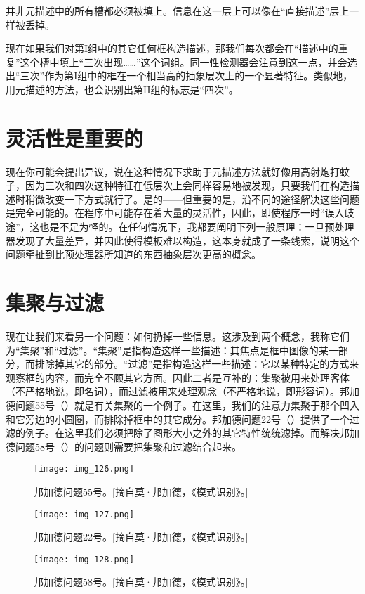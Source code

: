 并非元描述中的所有槽都必须被填上。信息在这一层上可以像在“直接描述”层上一样被丢掉。

现在如果我们对第I组中的其它任何框构造描述，那我们每次都会在“描述中的重复”这个槽中填上“三次出现……”这个词组。同一性检测器会注意到这一点，并会选出“三次”作为第I组中的框在一个相当高的抽象层次上的一个显著特征。类似地，用元描述的方法，也会识别出第II组的标志是“四次”。

\section{灵活性是重要的}

现在你可能会提出异议，说在这种情况下求助于元描述方法就好像用高射炮打蚊子，因为三次和四次这种特征在低层次上会同样容易地被发现，只要我们在构造描述时稍微改变一下方式就行了。是的——但重要的是，沿不同的途径解决这些问题是完全可能的。在程序中可能存在着大量的灵活性，因此，即使程序一时“误入歧途”，这也是不足为怪的。在任何情况下，我都要阐明下列一般原理：一旦预处理器发现了大量差异，并因此使得模板难以构造，这本身就成了一条线索，说明这个问题牵扯到比预处理器所知道的东西抽象层次更高的概念。

\section{集聚与过滤}

现在让我们来看另一个问题：如何扔掉一些信息。这涉及到两个概念，我称它们为“集聚”和“过滤”。“集聚”是指构造这样一些描述：其焦点是框中图像的某一部分，而排除掉其它的部分。“过滤”是指构造这样一些描述：它以某种特定的方式来观察框的内容，而完全不顾其它方面。因此二者是互补的：集聚被用来处理客体（不严格地说，即名词），而过滤被用来处理观念（不严格地说，即形容词）。邦加德问题55号（）就是有关集聚的一个例子。在这里，我们的注意力集聚于那个凹入和它旁边的小圆圈，而排除掉框中的其它成分。邦加德问题22号（）提供了一个过滤的例子。在这里我们必须把除了图形大小之外的其它特性统统滤掉。而解决邦加德问题58号（）的问题则需要把集聚和过滤结合起来。

\begin{figure}
\texttt{[image: img\_126.png]}
\caption[邦加德问题55号。]
  {邦加德问题55号。[摘自莫·邦加德，《模式识别》。]}
\end{figure}

\begin{figure}
\texttt{[image: img\_127.png]}
\caption[邦加德问题22号。]
  {邦加德问题22号。[摘自莫·邦加德，《模式识别》。]}
\end{figure}

\begin{figure}
\texttt{[image: img\_128.png]}
\caption[邦加德问题58号。]
  {邦加德问题58号。[摘自莫·邦加德，《模式识别》。]}
\end{figure}

